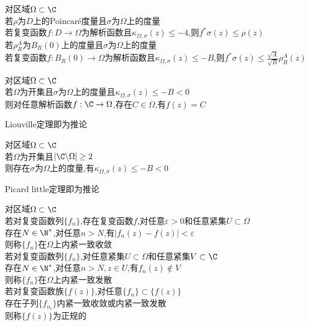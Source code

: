 \begin{dingli}
对区域$\Omega\subset \C$\\
若$\rho$为$D$上的Poincaré度量且$\sigma$为$\Omega$上的度量\\
若复变函数$f:D\to \Omega$为解析函数且$\kappa_{\Omega,\sigma}(z)\leq -4$,则$f^*\sigma(z)\leq\rho(z)$\\
若$\rho_{R}^{A}$为$B_{R}(0)$上的度量且$\sigma$为$\Omega$上的度量\\
若复变函数$f:B_{R}(0)\to \Omega$为解析函数且$\kappa_{\Omega,\sigma}(z)\leq -B$,则$f^*\sigma(z)\leq\frac{\sqrt{A}}{\sqrt{B}}\rho_{R}^{A}(z)$
\end{dingli}

\begin{dingli}
对区域$\Omega\subset \C$\\
若$\Omega$为开集且$\sigma$为$\Omega$上的度量且$\kappa_{\Omega,\sigma}(z)\leq -B<0$\\
则对任意解析函数$f:\C\to \Omega$,存在$C\in\Omega$,有$f(z)=C$
\end{dingli}

\begin{zhu}
Liouville定理即为推论
\end{zhu}

\begin{dingli}
对区域$\Omega\subset \C$\\
若$\Omega$为开集且$|\C\backslash \Omega|\geq 2$\\
则存在$\sigma$为$\Omega$上的度量,有$\kappa_{\Omega,\sigma}(z)\leq -B<0$
\end{dingli}

\begin{zhu}
Picard little定理即为推论
\end{zhu}

\begin{dingyi}
对区域$\Omega\subset \C$\\
若对复变函数列$\{f_n\}$,存在复变函数$f$,对任意$\varepsilon>0$和任意紧集$U\subset\Omega$\\
存在$N\in\N^*$,对任意$n>N$,有$|f_n(z)-f(z)|<\varepsilon$\\
则称$\{f_n\}$在$\Omega$上内紧一致收敛\\
若对复变函数列$\{f_n\}$,对任意紧集$U\subset\Omega$和任意紧集$V\subset\C$\\
存在$N\in\N^*$,对任意$n>N,z\in U$,有$f_n(z)\notin V$\\
则称$\{f_n\}$在$\Omega$上内紧一致发散\\
若对复变函数族$\{f(z)\}$,对任意$\{f_n\}\subset\{f(z)\}$\\
存在子列$\{f_{n_i}\}$内紧一致收敛或内紧一致发散\\
则称$\{f(z)\}$为正规的
\end{dingyi}

